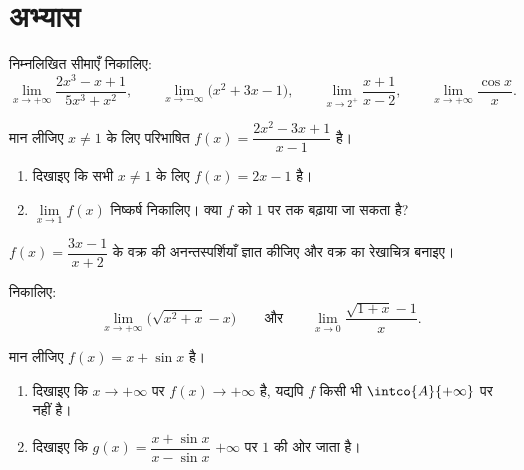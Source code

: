 \section{अभ्यास}

\begin{exercise}[$\star$]\label{exo:g12:limcont:1}
निम्नलिखित सीमाएँ निकालिए:
\[
\lim_{x\to+\infty} \frac{2x^3 - x + 1}{5x^3 + x^2}, \qquad
\lim_{x\to-\infty} \bigl(x^2 + 3x - 1\bigr), \qquad
\lim_{x\to 2^+} \frac{x+1}{x-2}, \qquad
\lim_{x\to+\infty} \frac{\cos x}{x}.
\]
\end{exercise}

\begin{exercise}[$\star$]\label{exo:g12:limcont:2}
मान लीजिए $x \neq 1$ के लिए परिभाषित $f(x) = \dfrac{2x^2 - 3x + 1}{x - 1}$ है।
\begin{enumerate}
  \item दिखाइए कि सभी $x \neq 1$ के लिए $f(x) = 2x - 1$ है।
  \item $\lim\limits_{x \to 1} f(x)$ निष्कर्ष निकालिए। क्या $f$ को $1$ पर   तक बढ़ाया
        जा सकता है?
\end{enumerate}
\end{exercise}

\begin{exercise}[$\star$]\label{exo:g12:limcont:3}
$f(x) = \dfrac{3x - 1}{x + 2}$ के वक्र की अनन्तस्पर्शियाँ ज्ञात कीजिए और वक्र का रेखाचित्र बनाइए।
\end{exercise}

\begin{exercise}[$\star\star$]\label{exo:g12:limcont:4}
निकालिए:
\[
\lim_{x\to+\infty} \bigl(\sqrt{x^2 + x} - x\bigr)
\qquad\text{और}\qquad
\lim_{x\to 0} \frac{\sqrt{1+x} - 1}{x}.
\]
\end{exercise}

\begin{exercise}[$\star\star$]\label{exo:g12:limcont:5}
मान लीजिए $f(x) = x + \sin x$ है।
\begin{enumerate}
  \item दिखाइए कि $x \to +\infty$ पर $f(x) \to +\infty$ है, यद्यपि $f$ किसी भी  $\intco{A}{+\infty}$ पर
         नहीं है।
  \item दिखाइए कि $g(x) = \dfrac{x + \sin x}{x - \sin x}$ $+\infty$ पर $1$ की ओर जाता है।
\end{enumerate}
\end{exercise}


